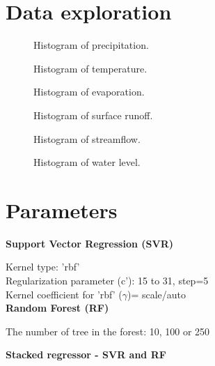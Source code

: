 \section{Data exploration}

  \begin{figure}[H]
  \centering
  
  \caption{Histogram of precipitation.}
  \end{figure}

    \begin{figure}[H]
  \centering
  
  \caption{Histogram of temperature.}
  \end{figure}

    \begin{figure}[H]
  \centering
  
  \caption{Histogram of evaporation.}
  \end{figure}

    \begin{figure}[H]
  \centering
  
  \caption{Histogram of surface runoff.}
  \end{figure}

      \begin{figure}[H]
  \centering
  
  \caption{Histogram of streamflow.}
  \end{figure}

      \begin{figure}[H]
  \centering
  
  \caption{Histogram of water level.}
  \end{figure}

\section{Parameters}
\noindent
\textbf{Support Vector Regression (SVR)}

\noindent
Kernel type: 'rbf' \\
Regularization parameter (c'): 15 to 31, step=5\\
Kernel coefficient for 'rbf' ($\gamma$)= scale/auto\\

\noindent
\textbf{Random Forest (RF)}

\noindent
The number of tree in the forest: 10, 100 or 250

\noindent
\textbf{Stacked regressor - SVR and RF}

